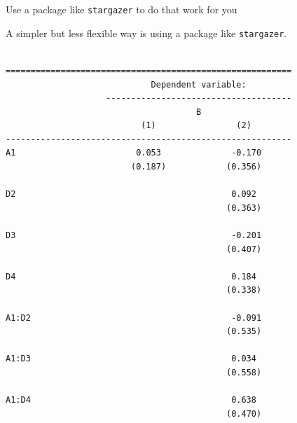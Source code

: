 \begin{frame}[fragile]{Use a package like \texttt{stargazer} to do that
work for you}

A simpler but less flexible way is using a package like
\texttt{stargazer}. \tiny

\begin{Shaded}
\begin{Highlighting}[]
 \NormalTok{)}
\end{Highlighting}
\end{Shaded}

\begin{verbatim}

=========================================================
                             Dependent variable:         
                    -------------------------------------
                                      B                  
                           (1)                (2)        
---------------------------------------------------------
A1                        0.053              -0.170      
                         (0.187)            (0.356)      
                                                         
D2                                           0.092       
                                            (0.363)      
                                                         
D3                                           -0.201      
                                            (0.407)      
                                                         
D4                                           0.184       
                                            (0.338)      
                                                         
A1:D2                                        -0.091      
                                            (0.535)      
                                                         
A1:D3                                        0.034       
                                            (0.558)      
                                                         
A1:D4                                        0.638       
                                            (0.470)      
                                                         

\end{verbatim}
\end{frame}
